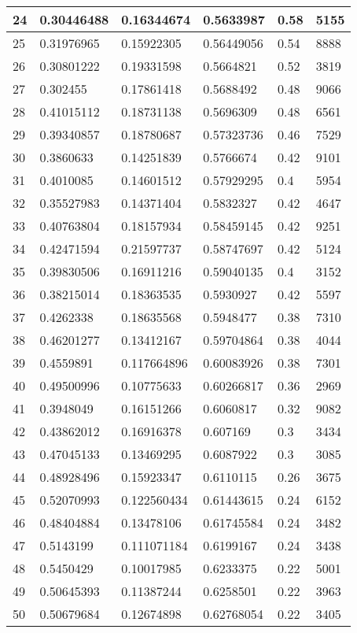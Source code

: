 \begin{longtable}{|l|l|l|l|l|l|}
24 & 0.30446488 & 0.16344674 & 0.5633987 & 0.58 & 5155 \\ \hline 
25 & 0.31976965 & 0.15922305 & 0.56449056 & 0.54 & 8888 \\ \hline 
26 & 0.30801222 & 0.19331598 & 0.5664821 & 0.52 & 3819 \\ \hline 
27 & 0.302455 & 0.17861418 & 0.5688492 & 0.48 & 9066 \\ \hline 
28 & 0.41015112 & 0.18731138 & 0.5696309 & 0.48 & 6561 \\ \hline 
29 & 0.39340857 & 0.18780687 & 0.57323736 & 0.46 & 7529 \\ \hline 
30 & 0.3860633 & 0.14251839 & 0.5766674 & 0.42 & 9101 \\ \hline 
31 & 0.4010085 & 0.14601512 & 0.57929295 & 0.4 & 5954 \\ \hline 
32 & 0.35527983 & 0.14371404 & 0.5832327 & 0.42 & 4647 \\ \hline 
33 & 0.40763804 & 0.18157934 & 0.58459145 & 0.42 & 9251 \\ \hline 
34 & 0.42471594 & 0.21597737 & 0.58747697 & 0.42 & 5124 \\ \hline 
35 & 0.39830506 & 0.16911216 & 0.59040135 & 0.4 & 3152 \\ \hline 
36 & 0.38215014 & 0.18363535 & 0.5930927 & 0.42 & 5597 \\ \hline 
37 & 0.4262338 & 0.18635568 & 0.5948477 & 0.38 & 7310 \\ \hline 
38 & 0.46201277 & 0.13412167 & 0.59704864 & 0.38 & 4044 \\ \hline 
39 & 0.4559891 & 0.117664896 & 0.60083926 & 0.38 & 7301 \\ \hline 
40 & 0.49500996 & 0.10775633 & 0.60266817 & 0.36 & 2969 \\ \hline 
41 & 0.3948049 & 0.16151266 & 0.6060817 & 0.32 & 9082 \\ \hline 
42 & 0.43862012 & 0.16916378 & 0.607169 & 0.3 & 3434 \\ \hline 
43 & 0.47045133 & 0.13469295 & 0.6087922 & 0.3 & 3085 \\ \hline 
44 & 0.48928496 & 0.15923347 & 0.6110115 & 0.26 & 3675 \\ \hline 
45 & 0.52070993 & 0.122560434 & 0.61443615 & 0.24 & 6152 \\ \hline 
46 & 0.48404884 & 0.13478106 & 0.61745584 & 0.24 & 3482 \\ \hline 
47 & 0.5143199 & 0.111071184 & 0.6199167 & 0.24 & 3438 \\ \hline 
48 & 0.5450429 & 0.10017985 & 0.6233375 & 0.22 & 5001 \\ \hline 
49 & 0.50645393 & 0.11387244 & 0.6258501 & 0.22 & 3963 \\ \hline 
50 & 0.50679684 & 0.12674898 & 0.62768054 & 0.22 & 3405 \\ \hline 
\end{longtable}